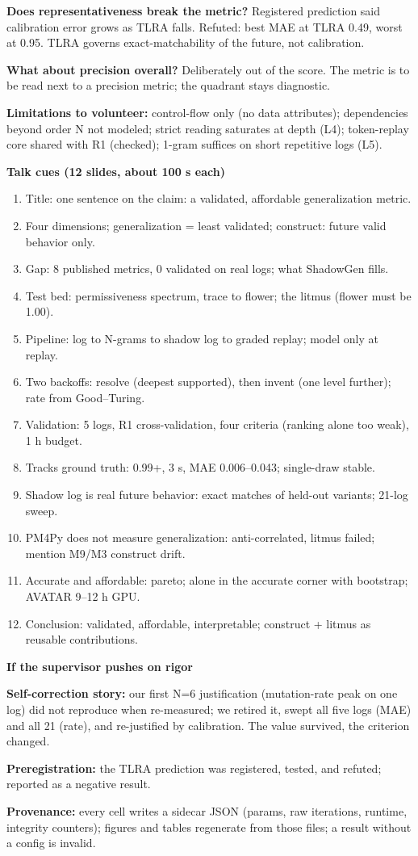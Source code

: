 \documentclass[10pt,twocolumn]{article}
\newcommand{\hdr}[1]{\vspace{5pt}\noindent\textcolor{hd}{\textbf{\large #1}}\par\vspace{2pt}}
\newcommand{\kv}[2]{\noindent\textbf{#1} #2\par}
\begin{document}
\kv{Does representativeness break the metric?}{Registered prediction said calibration error grows as TLRA falls. Refuted: best MAE at TLRA 0.49, worst at 0.95. TLRA governs exact-matchability of the future, not calibration.}
\kv{What about precision overall?}{Deliberately out of the score. The metric is to be read next to a precision metric; the quadrant stays diagnostic.}
\kv{Limitations to volunteer:}{control-flow only (no data attributes); dependencies beyond order N not modeled; strict reading saturates at depth (L4); token-replay core shared with R1 (checked); 1-gram suffices on short repetitive logs (L5).}

\hdr{Talk cues (12 slides, about 100 s each)}
\begin{enumerate}
\item Title: one sentence on the claim: a validated, affordable generalization metric.
\item Four dimensions; generalization = least validated; construct: future valid behavior only.
\item Gap: 8 published metrics, 0 validated on real logs; what ShadowGen fills.
\item Test bed: permissiveness spectrum, trace to flower; the litmus (flower must be 1.00).
\item Pipeline: log to N-grams to shadow log to graded replay; model only at replay.
\item Two backoffs: resolve (deepest supported), then invent (one level further); rate from Good--Turing.
\item Validation: 5 logs, R1 cross-validation, four criteria (ranking alone too weak), 1 h budget.
\item Tracks ground truth: 0.99+, 3 s, MAE 0.006--0.043; single-draw stable.
\item Shadow log is real future behavior: exact matches of held-out variants; 21-log sweep.
\item PM4Py does not measure generalization: anti-correlated, litmus failed; mention M9/M3 construct drift.
\item Accurate and affordable: pareto; alone in the accurate corner with bootstrap; AVATAR 9--12 h GPU.
\item Conclusion: validated, affordable, interpretable; construct + litmus as reusable contributions.
\end{enumerate}

\hdr{If the supervisor pushes on rigor}
\kv{Self-correction story:}{our first N=6 justification (mutation-rate peak on one log) did not reproduce when re-measured; we retired it, swept all five logs (MAE) and all 21 (rate), and re-justified by calibration. The value survived, the criterion changed.}
\kv{Preregistration:}{the TLRA prediction was registered, tested, and refuted; reported as a negative result.}
\kv{Provenance:}{every cell writes a sidecar JSON (params, raw iterations, runtime, integrity counters); figures and tables regenerate from those files; a result without a config is invalid.}
\end{document}
